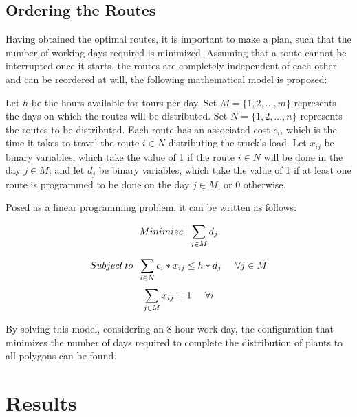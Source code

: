 \documentclass{amsart}
\begin{document}
        
        \subsection{Ordering the Routes}\label{OrderRoutes}
        Having obtained the optimal routes, it is important to make a plan, such that the number of working days required is minimized. Assuming that a route cannot be interrupted once it starts, the routes are completely independent of each other and can be reordered at will, the following mathematical model is proposed:
        
        Let $h$ be the hours available for tours per day. Set $M=\{1, 2, ... , m\}$ represents the days on which the routes will be distributed. Set $N = \{1, 2, ..., n\}$ represents the routes to be distributed. Each route has an associated cost $c_i$, which is the time it takes to travel the route $i \in N$ distributing the truck's load. Let $x_{ij}$ be binary variables, which take the value of 1 if the route $i\in N$ will be done in the day $j \in M$; and let $d_j$ be binary variables, which take the value of 1 if at least one route is programmed to be done on the day $j \in M$, or 0 otherwise.
        
        Posed as a linear programming problem, it can be written as follows:
        
        \begin{equation}
            Minimize \hspace{0.2cm} \sum_{j \in M} d_j
        \end{equation}
        
        $$Subject \hspace{0.07cm} to \hspace{0.2cm} \sum_{i \in N} c_i*x_{ij} \leq h * d_j \hspace{0.5cm} \forall j \in M$$
        $$\sum_{j \in M} x_{ij} = 1 \hspace{0.5cm} \forall i$$
        \vspace{0.4cm}
        
        By solving this model, considering an 8-hour work day, the configuration that minimizes the number of days required to complete the distribution of plants to all polygons can be found.

    \section{Results}
\end{document}

